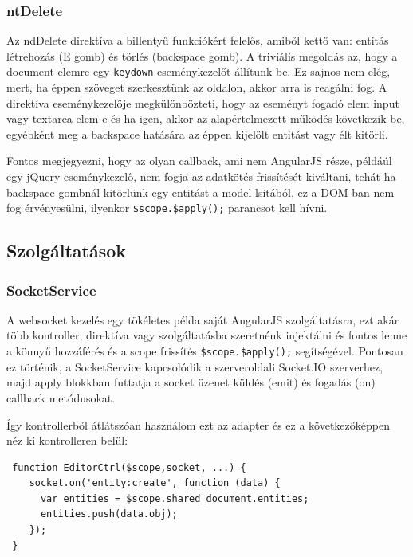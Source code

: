 \subsubsection{ntDelete}

Az ndDelete direktíva a billentyű funkciókért felelős, amiből kettő van: entitás létrehozás (E gomb) és törlés (backspace gomb). A triviális megoldás az, hogy a document elemre egy \lstinline{keydown} eseménykezelőt állítunk be. Ez sajnos nem elég, mert, ha éppen szöveget szerkesztünk az oldalon, akkor arra is reagálni fog. A direktíva eseménykezelője megkülönbözteti, hogy az eseményt fogadó elem input vagy textarea elem-e és ha igen, akkor az alapértelmezett működés következik be, egyébként meg a backspace hatására az éppen kijelölt entitást vagy élt kitörli.

Fontos megjegyezni, hogy az olyan callback, ami nem AngularJS része, példáúl egy jQuery eseménykezelő, nem fogja az adatkötés frissítését kiváltani, tehát ha backspace gombnál kitörlünk egy entitást a model lsitából, ez a DOM-ban nem fog érvényesülni, ilyenkor \lstinline{$scope.$apply();} parancsot kell hívni. 

\subsection{Szolgáltatások}

\subsubsection{SocketService}

A websocket kezelés egy tökéletes példa saját AngularJS szolgáltatásra, ezt akár több kontroller, direktíva vagy szolgáltatásba szeretnénk injektálni és fontos lenne a könnyű hozzáférés és a scope frissítés \lstinline{$scope.$apply();} segítségével. Pontosan ez történik, a SocketService kapcsolódik a szerveroldali Socket.IO szerverhez, majd apply blokkban futtatja a socket üzenet küldés (emit) és fogadás (on) callback metódusokat.

Így kontrollerből átlátszóan használom ezt az adapter és ez a következőképpen néz ki kontrolleren belül:

\begin{lstlisting}
 function EditorCtrl($scope,socket, ...) {
    socket.on('entity:create', function (data) {
      var entities = $scope.shared_document.entities;
      entities.push(data.obj);
    });
 }
\end{lstlisting}

